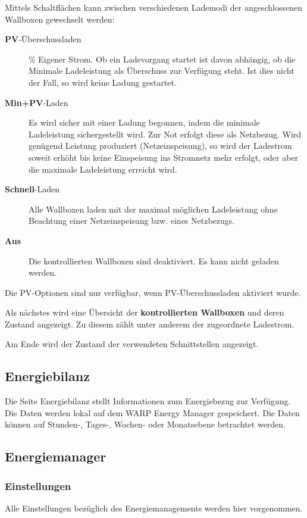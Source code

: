 \documentclass[a4paper,10pt]{article}
\newcommand{\gfx}[1]{\texttt{[image: \#1]}}
\begin{document}
\begin{multicols*}{2}
	Mittels Schaltflächen kann zwischen verschiedenen Lademodi der angeschlossenen 
	Wallboxen gewechselt werden:
	\begin{description}
	\item[\textbf{PV}-Überschussladen] \% Eigener Strom\grqq. Ob ein
	Ladevorgang startet ist davon abhängig, ob die Minimale Ladeleistung
	als Überschuss zur Verfügung steht. Ist dies nicht der Fall, so
	wird keine Ladung gestartet.
	\item[\textbf{Min+PV}-Laden] Es wird sicher mit einer Ladung begonnen, indem 
	die minimale Ladeleistung sichergestellt wird. Zur Not erfolgt diese als
	Netzbezug. Wird genügend Leistung produziert (Netzeinspeisung), so wird
	der Ladestrom soweit erhöht bis keine Einspeisung ins Stromnetz mehr
	erfolgt, oder aber die maximale Ladeleistung erreicht wird.
	\item[\textbf{Schnell}-Laden] Alle Wallboxen laden mit der maximal möglichen
	Ladeleistung ohne Beachtung einer Netzeinspeisung bzw. eines Netzbezugs.
	\item[\textbf{Aus}] Die kontrollierten Wallboxen sind deaktiviert. Es kann
	nicht geladen werden.
	\end{description}
	Die PV-Optionen sind nur verfügbar, wenn PV-Überschussladen aktiviert wurde.

	Als nächstes wird eine Übersicht der \textbf{kontrollierten Wallboxen} und deren
	Zustand angezeigt. Zu diesem zählt unter anderem der zugeordnete Ladestrom.

	Am Ende wird der Zustand der verwendeten Schnittstellen angezeigt.



	\subsection{Energiebilanz}
	Die Seite Energiebilanz stellt Informationen zum Energiebezug zur Verfügung.
	Die Daten werden lokal auf dem WARP Energy Manager gespeichert. Die Daten
	können auf Stunden-, Tages-, Wochen- oder Monatsebene betrachtet werden.

	\subsection{Energiemanager}
	\subsubsection{Einstellungen}
	Alle Einstellungen bezüglich des Energiemanagements werden hier vorgenommen.


\end{multicols*}
\end{document}
